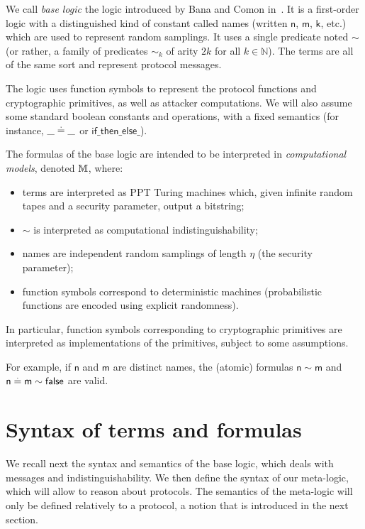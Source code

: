 We call \emph{base logic} the logic introduced by Bana and Comon in~\cite{Bana:2014:CCS:2660267.2660276}.
It is a first-order logic with a distinguished kind of constant called names (written $\mathsf{n}$, $\mathsf{m}$, $\mathsf{k}$, etc.) which are used to represent random samplings. It uses a single predicate noted $\sim$ (or rather, a family
of predicates $\sim_k$ of arity $2 k$ for all $k\in\mathbb{N}$).
The terms are all of the same sort and represent protocol messages.

The logic uses function symbols to represent the protocol functions and cryptographic primitives, as well as attacker computations.
We will also assume some standard boolean constants and operations, with
a fixed semantics (for instance, $\_ \stackrel{.}{=} \_$ or
$\mathsf{if \_ then \_ else \_}$).

The formulas of the base logic are intended to be interpreted in
\emph{computational models}, denoted $\mathbb{M}$, where:
\begin{itemize}
  \item terms are interpreted as PPT Turing machines which,
    given infinite random tapes and a security parameter, output a bitstring;
  \item $\sim$ is interpreted as computational indistinguishability;
  \item names are independent random samplings of length $\eta$ (the security parameter);
  \item function symbols correspond to deterministic machines (probabilistic functions are encoded using explicit randomness).
\end{itemize}

In particular, function symbols corresponding to cryptographic primitives
are interpreted as implementations of the primitives, subject to some
assumptions.

For example, if $\mathsf{n}$ and $\mathsf{m}$ are distinct names,
the (atomic) formulas $\mathsf{n}\sim\mathsf{m}$ and
$\mathsf{n} \stackrel{.}{=} \mathsf{m}\sim\mathsf{false}$
are valid.

\section{Syntax of terms and formulas}

We recall next the syntax and semantics of the base logic, which deals with
messages and indistinguishability.
We then define the syntax of our meta-logic, which will allow to reason about
protocols. The semantics of the meta-logic will only be defined relatively to a
protocol, a notion that is introduced in the next section.

